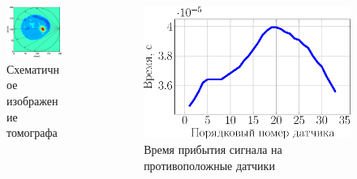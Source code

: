 \documentclass{beamer}
\begin{document}
\begin{frame}
\begin{columns}
	\begin{column}{0.4\textwidth}
		\begin{figure}[h]
    		\centering
    		\includegraphics[width=\textwidth]{pics/tomo_scheme.png}
    		\caption{\small Схематичное изображение томографа}
    		\label{fig:pic1}
		\end{figure}
    \end{column}
    \begin{column}{0.55\textwidth}
		\begin{figure}[h]
      		\centering
      		\includegraphics[width=\textwidth]{pics_eps/arrivals.eps}
      		\caption{Время прибытия сигнала на противоположные датчики}
      		\label{fig:pic2}
		\end{figure}
    \end{column}
\end{columns}


\end{frame}
\end{document}
